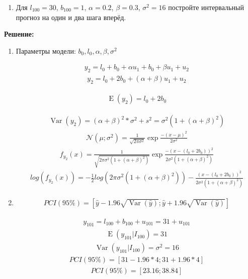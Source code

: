 \documentclass[a4paper,14pt]{article}
\DeclareMathOperator{\Var}{Var}
\DeclareMathOperator{\E}{E}
\def \s{\sigma}
\def \cN{\mathcal{N}}
\begin{document}
\begin{enumerate}
\begin{enumerate}
	\item Для $l_{100} = 30$, $b_{100} = 1$, $\alpha=0.2$, $\beta=0.3$, $\sigma^2 = 16$ постройте
	интервальный прогноз на один и два шага вперёд. 
\end{enumerate}

{\bf Решение:}

\begin{enumerate}
	\item Параметры модели: $b_0, l_0, \alpha, \beta, \s^2$

             \[\begin{aligned}
y_2 = l_0 + b_0 + \alpha u_1 + b_0 + \beta u_1 + u_2
	\end{aligned}\]
              \[\begin{aligned}
y_2 = l_0 + 2b_0 + (\alpha + \beta) u_1 + u_2
	\end{aligned}\]

               \[\begin{aligned}
\E(y_2) = l_0 + 2b_0
	\end{aligned}\]
 
                \[\begin{aligned}
\Var(y_2) = (\alpha + \beta)^2*\s^2 + s^2 = \s^2(1 + (\alpha + \beta)^2)
	\end{aligned}\]
                 \[\begin{aligned}
\cN(\mu;\sigma^2) = \frac{1}{\sqrt{2\pi \s^2}} \exp{\frac{-(x-\mu)^2}{2\s^2}}
	\end{aligned}\]
                 \[\begin{aligned}
f_{y_2}(x) = \frac{1}{\sqrt{2\pi \s^2(1 + (\alpha + \beta)^2)}} \exp{\frac{-(x-(l_0 + 2b_0))^2}{2\s^2(1 + (\alpha + \beta)^2)}} 
	\end{aligned}\]
                  \[\begin{aligned}
log(f_{y_2}(x)) = - \frac{1}{2}log(2\pi \s^2(1 + (\alpha + \beta)^2)) - \frac{(x-(l_0 + 2b_0))^2}{2\s^2(1 + (\alpha + \beta)^2)}
	\end{aligned}\]
 
	\item    
 
 \[\begin{aligned}
PCI(95\%) = [ \hat{y} - 1.96\sqrt{\Var(\hat{y})}; \hat{y} + 1.96\sqrt{\Var(\hat{y})}]
	\end{aligned}\]

  \[\begin{aligned}
y_{101} = l_{100} + b_{100} + u_{101} = 31 + u_{101} 
	\end{aligned}\]
   \[\begin{aligned}
\E(y_{101}|I_{100}) = 31 
	\end{aligned}\]
    \[\begin{aligned}
\Var(y_{101}|I_{100}) = \s^2 = 16
	\end{aligned}\]
  \[\begin{aligned}
PCI(95\%) = [ 31 - 1.96*4; 31+ 1.96*4]
	\end{aligned}\]
   \[\begin{aligned}
PCI(95\%) = [ 23.16; 38.84]
	\end{aligned}\]


\end{enumerate}
\end{enumerate}
\end{document}
